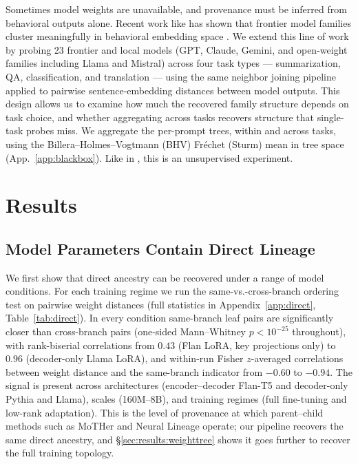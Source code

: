\documentclass{article}
\theoremstyle{definition}
\theoremstyle{plain}
\begin{document}
Sometimes model weights are unavailable, and provenance must be inferred from behavioral outputs alone. Recent work like \cite{yax2025phylolm} has shown that frontier model families cluster meaningfully in behavioral embedding space
\citep{wu2026llmdna, yax2025phylolm}. We extend this line of work by probing 23 frontier and local models (GPT, Claude, Gemini, and open-weight families including Llama and Mistral) across four task types --- summarization, QA, classification, and translation --- using the same neighbor joining pipeline applied to pairwise sentence-embedding distances between model outputs. This design allows us to examine how much the recovered family structure depends
on task choice, and whether aggregating across tasks recovers structure that
single-task probes miss. We aggregate the per-prompt trees, within and across tasks, using the
Billera--Holmes--Vogtmann (BHV) Fr\'echet (Sturm) mean in tree space~\citep{billera2001geometry, willis2019confidence} (App.~\ref{app:blackbox}).  Like in \cite{yax2025phylolm}, this is an unsupervised experiment.


\section{Results}
\label{sec:results}


\subsection{Model Parameters Contain Direct Lineage}

We first show that direct ancestry can be recovered under a range of model conditions.
For each training regime we run the same-vs.-cross-branch ordering test on pairwise weight distances
(full statistics in Appendix~\ref{app:direct}, Table~\ref{tab:direct}). In every condition same-branch
leaf pairs are significantly closer than cross-branch pairs (one-sided Mann--Whitney $p<10^{-25}$
throughout), with rank-biserial correlations from $0.43$ (Flan LoRA, key projections only) to $0.96$
(decoder-only Llama LoRA), and within-run Fisher $z$-averaged correlations between weight distance and
the same-branch indicator from $-0.60$ to $-0.94$. The signal is present across architectures
(encoder--decoder Flan-T5 and decoder-only Pythia and Llama), scales (160M--8B), and training regimes
(full fine-tuning and low-rank adaptation). This is the level of provenance at which parent--child
methods such as MoTHer \citep{horwitz2024mother} and Neural Lineage \citep{yu2025neural,
yu2024neurallineage} operate; our pipeline recovers the same direct ancestry, and
\S\ref{sec:results:weighttree} shows it goes further to recover the full training topology.
\end{document}
